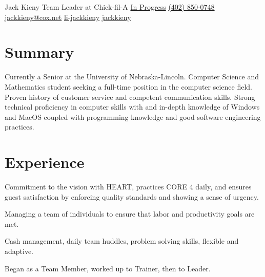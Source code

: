 \documentclass[]{latex/resume}
\begin{document}
%
%

\namesection
    {Jack}
    {Kieny}
    {Team Leader at Chick-fil-A}
    {\contactline
        {\href{}{In Progress}}
        {\href{tel:+1402850047}{(402) 850-0748}}
        {\href{mailto:jackkieny@cox.net}{jackkieny@cox.net}}
        {\href{https://www.linkedin.com/in/jackkieny}{li-jackkieny}}
        {\href{https://www.github.com/jackkieny}{jackkieny}}
    }       
        

%
%

\begin{minipage}[t]{0.75\textwidth} 

\section{Summary}
Currently a Senior at the University of Nebraska-Lincoln. Computer Science and Mathematics student seeking a full-time position in the computer science field. 
Proven history of customer service and competent communication skills. 
Strong technical proficiency in computer skills with and in-depth knowledge of Windows and MacOS coupled with programming knowledge and good software engineering practices.

\sectionsep


\section{Experience}
     
    \vspace{\topsep} %
    \begin{tightemize}
        \sectionsep
            \item Commitment to the vision with HEART, practices CORE 4 daily, and ensures guest satisfaction by enforcing quality standards and showing a sense of urgency.
            \item Managing a team of individuals to ensure that labor and productivity goals are met.
            \item Cash management, daily team huddles, problem solving skills, flexible and adaptive.
            \item Began as a Team Member, worked up to Trainer, then to Leader.
    \end{tightemize}
    

\end{minipage}
\end{document}
